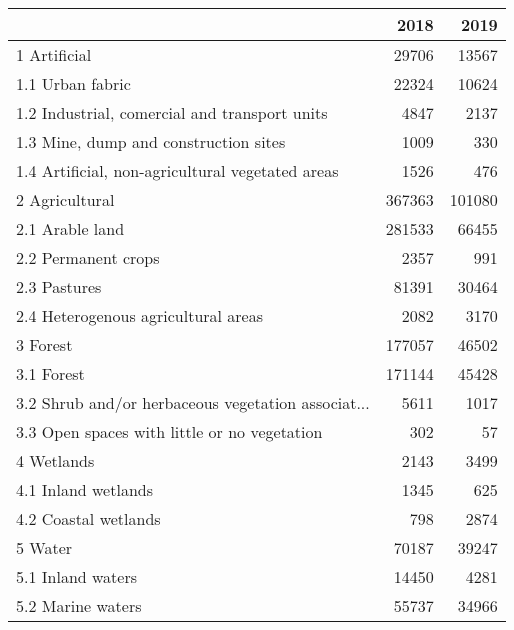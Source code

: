 \begin{tabular}{lrr}
\toprule
{} &    2018 &    2019 \\
\midrule
1 Artificial                                       &   29706 &   13567 \\
1.1 Urban fabric                                   &   22324 &   10624 \\
1.2 Industrial, comercial and transport units      &    4847 &    2137 \\
1.3 Mine, dump and construction sites              &    1009 &     330 \\
1.4 Artificial, non-agricultural vegetated areas   &    1526 &     476 \\
2 Agricultural                                     &  367363 &  101080 \\
2.1 Arable land                                    &  281533 &   66455 \\
2.2 Permanent crops                                &    2357 &     991 \\
2.3 Pastures                                       &   81391 &   30464 \\
2.4 Heterogenous agricultural areas                &    2082 &    3170 \\
3 Forest                                           &  177057 &   46502 \\
3.1 Forest                                         &  171144 &   45428 \\
3.2 Shrub and/or herbaceous vegetation associat... &    5611 &    1017 \\
3.3 Open spaces with little or no vegetation       &     302 &      57 \\
4 Wetlands                                         &    2143 &    3499 \\
4.1 Inland wetlands                                &    1345 &     625 \\
4.2 Coastal wetlands                               &     798 &    2874 \\
5 Water                                            &   70187 &   39247 \\
5.1 Inland waters                                  &   14450 &    4281 \\
5.2 Marine waters                                  &   55737 &   34966 \\
\bottomrule
\end{tabular}
